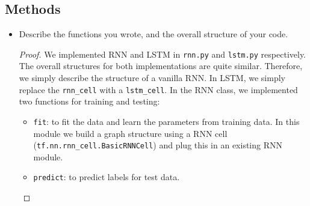 \documentclass[12pt]{article}
\newcommand{\1}{\mathbf{1}}
\begin{document}
{\subsection{Methods} 
\begin{itemize}
  \item Describe the functions you wrote, and the overall structure of your code.
  \begin{proof}
  	We implemented RNN and LSTM in {\tt rnn.py} and {\tt lstm.py} respectively. The overall structures for both implementations are quite similar. Therefore, we simply describe the structure of a vanilla RNN. In LSTM, we simply replace the {\tt rnn\_cell} with a {\tt lstm\_cell}. In the RNN class, we implemented two functions for training and testing:
  	\begin{itemize}
  	 	\item {\tt fit}: to fit the data and learn the parameters from training data. In this module we build a graph structure using a RNN cell ({\tt tf.nn.rnn\_cell.BasicRNNCell}) and plug this in an existing RNN module.
      \item {\tt predict}: to predict labels for test data.
  	 \end{itemize} 
  \end{proof}
\end{itemize}

}
\end{document}
